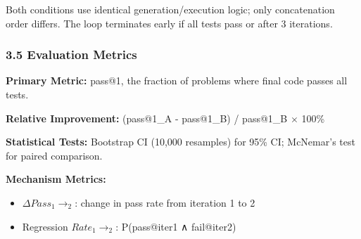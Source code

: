Both conditions use identical generation/execution logic; only concatenation order differs. The loop terminates early if all tests pass or after 3 iterations.

\subsubsection{3.5 Evaluation Metrics}

\textbf{Primary Metric:} pass@1, the fraction of problems where final code passes all tests.

\textbf{Relative Improvement:} (pass@1\_A - pass@1\_B) / pass@1\_B $\times$ 100\%

\textbf{Statistical Tests:} Bootstrap CI (10,000 resamples) for 95\% CI; McNemar's test for paired comparison.

\textbf{Mechanism Metrics:}
\begin{itemize}
\item $\Delta Pass_{1}\rightarrow _2$: change in pass rate from iteration 1 to 2
\item Regression $Rate_{1}\rightarrow _2$: P(pass@iter1 ∧ fail@iter2)
\end{itemize}

